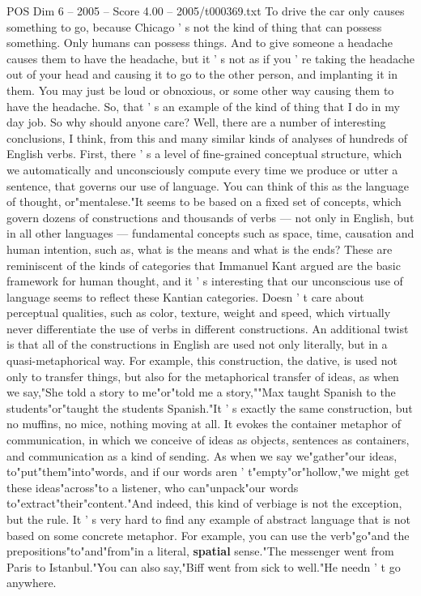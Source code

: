 \begin{textsample}{POS Dim 6 – 2005 – Score 4.00 – 2005/t000369.txt}
To drive the car only causes something to go, because Chicago ' s not the kind of thing that can possess something.
Only humans can possess things.
And to give someone a headache causes them to have the headache, but it ' s not as if you ' re taking the headache out of your head and causing it to go to the other person, and implanting it in them.
You may just be loud or obnoxious, or some other way causing them to have the headache.
So, that ' s an example of the kind of thing that I do in my day job.
So why should anyone care?
Well, there are a number of interesting conclusions, I think, from this and many similar kinds of analyses of hundreds of English verbs.
First, there ' s a level of fine-grained conceptual structure, which we automatically and unconsciously compute every time we produce or utter a sentence, that governs our use of language.
You can think of this as the language of thought, or"mentalese."It seems to be based on a fixed set of concepts, which govern dozens of constructions and thousands of verbs — not only in English, but in all other languages — fundamental concepts such as space, time, causation and human intention, such as, what is the means and what is the ends?
These are reminiscent of the kinds of categories that Immanuel Kant argued are the basic framework for human thought, and it ' s interesting that our unconscious use of language seems to reflect these Kantian categories.
Doesn ' t care about perceptual qualities, such as color, texture, weight and speed, which virtually never differentiate the use of verbs in different constructions.
An additional twist is that all of the constructions in English are used not only literally, but in a quasi-metaphorical way.
For example, this construction, the dative, is used not only to transfer things, but also for the metaphorical transfer of ideas, as when we say,"She told a story to me"or"told me a story,""Max taught Spanish to the students"or"taught the students Spanish."It ' s exactly the same construction, but no muffins, no mice, nothing moving at all.
It evokes the container metaphor of communication, in which we conceive of ideas as objects, sentences as containers, and communication as a kind of sending.
As when we say we"gather"our ideas, to"put"them"into"words, and if our words aren ' t"empty"or"hollow,"we might get these ideas"across"to a listener, who can"unpack"our words to"extract"their"content."And indeed, this kind of verbiage is not the exception, but the rule.
It ' s very hard to find any example of abstract language that is not based on some concrete metaphor.
For example, you can use the verb"go"and the prepositions"to"and"from"in a literal, \textbf{spatial} sense."The messenger went from Paris to Istanbul."You can also say,"Biff went from sick to well."He needn ' t go anywhere.

\end{textsample}
